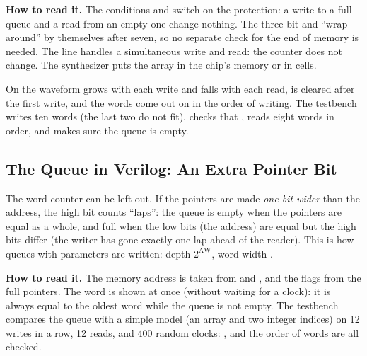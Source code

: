 
\textbf{How to read it.} The conditions  and  switch on
the protection: a write to a full queue and a read from an empty one change
nothing. The three-bit  and  ``wrap around'' by themselves
after seven, so no separate check for the end of memory is needed. The line
 handles a simultaneous write and read:
the counter does not change. The synthesizer puts the array  in
the chip's memory or in cells.


On the waveform  grows with each write and falls with each read,
 is cleared after the first write, and the words come out on
 in the order of writing. The testbench 
writes ten words (the last two do not fit), checks that , reads
eight words in order, and makes sure the queue is empty.

\subsection{The Queue in Verilog: An Extra Pointer Bit}

The word counter can be left out. If the pointers are made \emph{one bit wider}
than the address, the high bit counts ``laps'': the queue is empty when the
pointers are equal as a whole, and full when the low bits (the address) are
equal but the high bits differ (the writer has gone exactly one lap ahead of
the reader). This is how queues with parameters are written: depth
$2^{\text{AW}}$, word width .


\textbf{How to read it.} The memory address is taken from  and
, and the flags from the full pointers. The word 
is shown at once (without waiting for a clock): it is always equal to the oldest
word while the queue is not empty. The testbench  compares
the queue with a simple model (an array and two integer indices) on 12 writes in
a row, 12 reads, and 400 random clocks: ,  and the order
of words are all checked.

